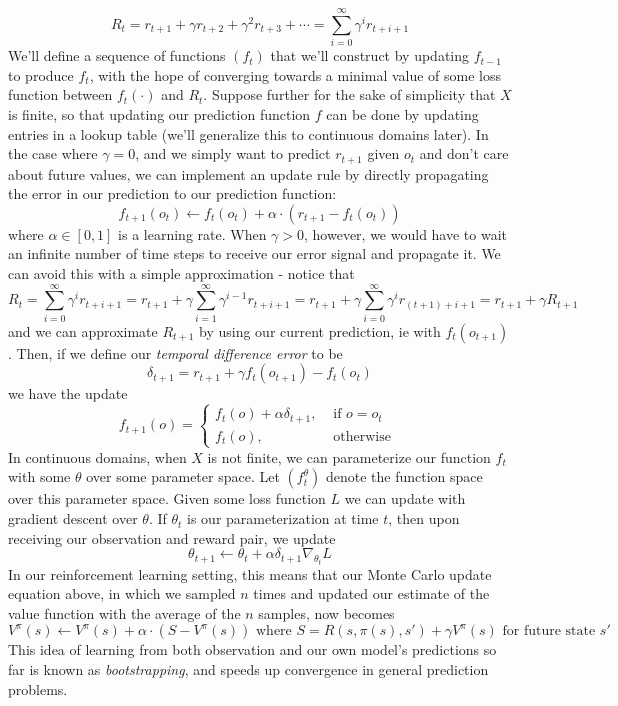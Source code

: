 \documentclass{article}
\begin{document}
    $$ R_t = r_{t + 1} + \gamma r_{t + 2} + \gamma^2 r_{t + 3} + \cdots = \sum_{i = 0}^\infty \gamma^i r_{t + i + 1} $$
We'll define a sequence of functions $ ( f_t ) $ that we'll construct by updating $ f_{t - 1} $ to produce $ f_t $, with the hope of converging towards a minimal value of some loss function between $ f_t(\cdot) $ and $ R_t $. Suppose further for the sake of simplicity that $ X $ is finite, so that updating our prediction function $ f $ can be done by updating entries in a lookup table (we'll generalize this to continuous domains later). In the case where $ \gamma = 0 $, and we simply want to predict $ r_{t + 1} $ given $ o_t $ and don't care about future values, we can implement an update rule by directly propagating the error in our prediction to our prediction function:
    $$ f_{t + 1}(o_t) \gets f_t(o_t) + \alpha \cdot (r_{t + 1} - f_t(o_t)) $$
where $ \alpha \in [0, 1] $ is a learning rate. When $ \gamma > 0 $, however, we would have to wait an infinite number of time steps to receive our error signal and propagate it. We can avoid this with a simple approximation - notice that
    $$ R_t = \sum_{i = 0}^\infty \gamma^i r_{t + i + 1} = r_{t + 1} + \gamma \sum_{i = 1}^\infty \gamma^{i - 1} r_{t + i + 1} = r_{t + 1} + \gamma \sum_{i = 0}^\infty \gamma^i r_{(t + 1) + i + 1} = r_{t + 1} + \gamma R_{t + 1} $$
and we can approximate $ R_{t + 1} $ by using our current prediction, ie with $ f_t(o_{t + 1}) $. Then, if we define our \textit{temporal difference error} to be
    $$ \delta_{t + 1} = r_{t + 1} + \gamma f_t(o_{t + 1}) - f_t(o_t) $$
we have the update
    $$ f_{t + 1}(o) = \begin{cases}
        f_t(o) + \alpha \delta_{t + 1}, &\text{ if } o = o_t \\
        f_t(o), &\text{ otherwise }
    \end{cases} $$
In continuous domains, when $ X $ is not finite, we can parameterize our function $ f_t $ with some $ \theta $ over some parameter space. Let $ ( f_t^\theta ) $ denote the function space over this parameter space. Given some loss function $ L $ we can update with gradient descent over $ \theta $. If $ \theta_t $ is our parameterization at time $ t $, then upon receiving our observation and reward pair, we update
    $$ \theta_{t + 1} \gets \theta_t + \alpha \delta_{t + 1} \nabla_{\theta_t} L $$
In our reinforcement learning setting, this means that our Monte Carlo update equation above, in which we sampled $ n $ times and updated our estimate of the value function with the average of the $ n $ samples, now becomes
    $$ V^\pi(s) \gets V^\pi(s) + \alpha \cdot (S - V^\pi(s)) \text{ where } S = R(s, \pi(s), s') + \gamma V^\pi(s) \text{ for future state } s' $$
This idea of learning from both observation and our own model's predictions so far is known as \textit{bootstrapping}, and speeds up convergence in general prediction problems.
\end{document}
